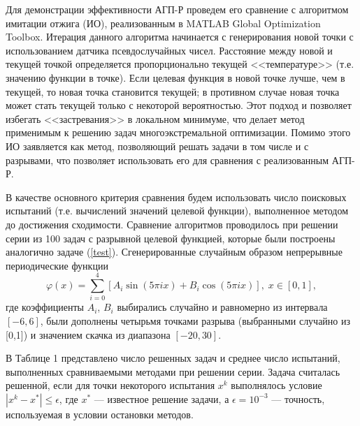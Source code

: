\documentclass[11pt, oneside, a4paper]{article}
\begin{document}
Для демонстрации эффективности АГП-Р проведем его сравнение с алгоритмом имитации отжига (ИО), реализованным в MATLAB Global Optimization Toolbox. 
Итерация данного алгоритма начинается с генерирования новой точки с использованием датчика псевдослучайных чисел. Расстояние между новой и текущей точкой определяется пропорционально текущей <<температуре>> (т.е. значению функции в точке). Если целевая функция в новой точке лучше, чем в текущей, то новая точка становится текущей; в противном случае новая точка может стать текущей только с некоторой вероятностью. Этот подход и позволяет избегать <<застревания>> в локальном минимуме, что делает метод применимым к решению задач многоэкстремальной оптимизации. Помимо этого ИО заявляется как метод, позволяющий решать задачи в том числе и с разрывами, что позволяет использовать его для сравнения с реализованным АГП-Р.


В качестве основного критерия сравнения будем использовать число поисковых испытаний (т.е. вычислений значений целевой функции), выполненное методом до достижения сходимости. 
Сравнение алгоритмов проводилось при решении серии из 100 задач с разрывной целевой функцией, которые были построены аналогично задаче (\ref{test}). Сгенерированные случайным образом непрерывные периодические функции 
\[
\varphi(x) = \sum_{i=0}^4{ \left[A_i\sin(5\pi i x) + B_i\cos(5\pi i x)\right] }, \; x\in[0,1],
\]
где коэффициенты $A_i$, $B_i$ выбирались случайно и равномерно из интервала $[-6,6]$, были дополнены четырьмя точками разрыва (выбранными случайно из [0,1]) и значением скачка из диапазона $[-20,30]$.  

В Таблице 1 представлено число решенных задач и среднее число испытаний, выполненных сравниваемыми методами при решении серии. Задача считалась решенной, если для точки некоторого испытания $x^k$ выполнялось условие $\left|x^k-x^*\right|\leq \epsilon$, где $x^*$ --- известное решение задачи, а $\epsilon=10^{-3}$ --- точность, используемая в условии остановки методов.
\end{document}
